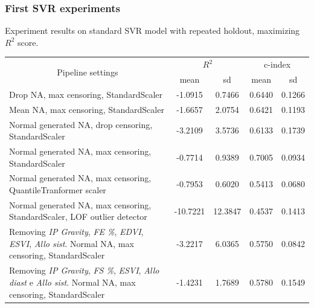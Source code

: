 \documentclass{beamer}
\newcommand{\nologo}{\setbeamertemplate{logo}{}}
\begin{document}
{\nologo
\begin{frame}
\frametitle{First SVR experiments}
{\scriptsize Experiment results on standard SVR model with repeated holdout, maximizing $R^2$ score.}
\begin{scriptsize}
\begin{center}
\vspace{-0.45cm}
 \begin{tabular}{ |m{5cm}|c|c|c|c| }
\hline
\multicolumn{1}{|c|}{\multirow{2}{*}{Pipeline settings}} & \multicolumn{2}{|c|}{$R^2$} & \multicolumn{2}{|c|}{c-index} \\ \cline{2-5}
& mean & sd & mean & sd \\ \hline
Drop NA, max censoring, StandardScaler & -1.0915 & 0.7466 & 0.6440 & 0.1266 \\ \hline
Mean NA, max censoring, StandardScaler & -1.6657 & 2.0754 & 0.6421 & 0.1193 \\ \hline
Normal generated NA, drop censoring, StandardScaler & -3.2109 & 3.5736 & 0.6133 & 0.1739 \\ \hline
Normal generated NA, max censoring, StandardScaler & -0.7714 & 0.9389 & 0.7005 & 0.0934 \\ \hline
Normal generated NA, max censoring, QuantileTranformer scaler & -0.7953 & 0.6020 & 0.5413 & 0.0680 \\ \hline
Normal generated NA, max censoring, StandardScaler, LOF outlier detector & -10.7221 & 12.3847 & 0.4537 & 0.1413 \\ \hline
Removing \textit{IP Gravity}, \textit{FE \%}, \textit{EDVI}, \textit{ESVI}, \textit{Allo sist}. Normal NA, max censoring, StandardScaler & -3.2217 & 6.0365 & 0.5750 & 0.0842 \\ \hline
Removing \textit{IP Gravity}, \textit{FS \%}, \textit{ESVI}, \textit{Allo diast} e \textit{Allo sist}. Normal NA, max censoring, StandardScaler & -1.4231 & 1.7689 & 0.5780 & 0.1549 \\ \hline
\end{tabular}
\end{center} 
\end{scriptsize}
\end{frame}}
\end{document}
